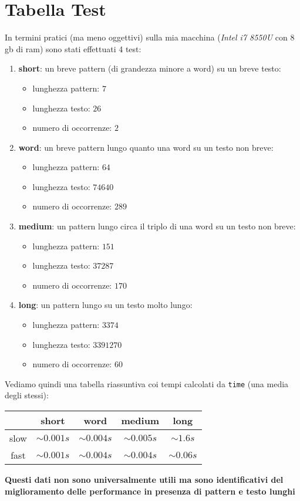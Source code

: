 \documentclass[a4paper,12pt, oneside]{article}
\begin{document}
\section*{Tabella Test}
In termini pratici (ma meno oggettivi) sulla mia macchina
(\textit{Intel i7 8550U} con $8$gb di ram) sono stati effettuati 4
test:
\begin{enumerate}
  \item \textbf{short}: un breve pattern (di grandezza minore a word)
  su un breve testo:
  \begin{itemize}
    \item lunghezza pattern: $7$
    \item lunghezza testo: $26$
    \item numero di occorrenze: $2$
  \end{itemize}
  \item \textbf{word}: un breve pattern lungo quanto una word su un
  testo non breve:
  \begin{itemize}
    \item lunghezza pattern: $64$
    \item lunghezza testo: $74640$
    \item numero di occorrenze: $289$
  \end{itemize}
  \item \textbf{medium}: un pattern lungo circa il triplo di una word
  su un testo non breve:
  \begin{itemize}
    \item lunghezza pattern: $151$
    \item lunghezza testo: $37287$
    \item numero di occorrenze: $170$
  \end{itemize}
  \item \textbf{long}: un pattern lungo su un testo molto lungo:
  \begin{itemize}
    \item lunghezza pattern: $3374$
    \item lunghezza testo: $3391270$
    \item numero di occorrenze: $60$
  \end{itemize}
\end{enumerate}
Vediamo quindi una tabella riassuntiva coi tempi calcolati da
\texttt{time} (una media degli stessi):
\begin{center}
  \begin{tabular}{|c|c|c|c|c|}
    \hline
    & short        & word         & medium       & long        \\ \hline\hline
    slow & $\sim 0.001s$ & $\sim 0.004s$ & $\sim 0.005s$ & $\sim 1.6s$  \\ \hline
    fast & $\sim 0.001s$ & $\sim 0.004s$ & $\sim 0.004s$ & $\sim 0.06s$ \\ \hline
  \end{tabular}
\end{center}
\textbf{Questi dati non sono universalmente utili ma sono
  identificativi del miglioramento delle performance in presenza di
  pattern e testo lunghi}
\end{document}
